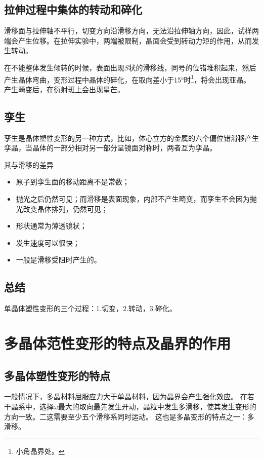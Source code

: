         \subsection{拉伸过程中集体的转动和碎化}
            滑移面与拉伸轴不平行，切变方向沿滑移方向，无法沿拉伸轴方向，因此，试样两端会产生位移。在拉伸实验中，两端被限制，晶面会受到转动力矩的作用，从而发生转动。

            在不能整体发生倾转的时候，表面出现$S$状的滑移线，同号的位错堆积起来，然后产生晶体弯曲，变形过程中晶体的碎化，在取向差小于\ang{15}时\footnote{小角晶界处。}，将会出现亚晶。
            产生畸变后，在衍射斑上会出现星芒。
        \subsection{孪生}
            孪生是晶体塑性变形的另一种方式，比如，体心立方的金属的六个偏位错滑移产生孪晶，当晶体的一部分相对另一部分呈镜面对称时，两者互为孪晶。
            
            其与滑移的差异
            \begin{itemize}
                \item[1] 原子到孪生面的移动距离不是常数；
                \item[2] 抛光之后仍然可见；而滑移是表面现象，内部不产生畸变，而孪生不会因为抛光改变晶体排列，仍然可见；
                \item[3] 形状通常为薄透镜状；
                \item[4] 发生速度可以很快；
                \item[5] 一般是滑移受阻时产生的。
            \end{itemize}
        \subsection{总结}
            单晶体塑性变形的三个过程：1.切变，2.转动，3.碎化。
    \section{多晶体范性变形的特点及晶界的作用}
        \subsection{多晶体塑性变形的特点}
            一般情况下，多晶材料屈服应力大于单晶材料，因为晶界会产生强化效应。
            在若干晶系中，选择$\omega$最大的取向最先发生开动，晶粒中发生多滑移，使其发生变形的方向一致。二这需要至少五个滑移系同时运动。
            这也是多晶变形的特点之一：多滑移。

